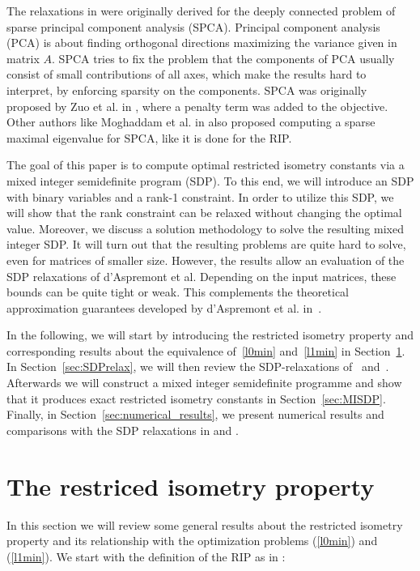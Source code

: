 \documentclass[journal]{IEEEtran}
\begin{document}
The relaxations in \cite{Asp07,Asp08} were originally derived for the deeply
connected problem of sparse principal component analysis (SPCA). Principal
component analysis (PCA) is about finding orthogonal directions maximizing the 
variance given in matrix $A$. SPCA tries to fix the problem that the components
of PCA usually consist of small contributions of all axes, which make the results
hard to interpret, by enforcing sparsity on the components. SPCA was
originally proposed by Zuo et al. in \cite{SPCA}, where a penalty term was added 
to the objective. Other authors like Moghaddam et al. in \cite{sbSPCA} also proposed 
computing a sparse maximal eigenvalue for SPCA, like it is done for the RIP.

The goal of this paper is to compute optimal restricted isometry constants
via a mixed integer semidefinite program (SDP). To this end, we will
introduce an SDP with binary variables and a rank-1 constraint. In order to
utilize this SDP, we will show that the rank constraint can be relaxed
without changing the optimal value. Moreover, we discuss a solution
methodology to solve the resulting mixed integer SDP. It will turn out that
the resulting problems are quite hard to solve, even for matrices of
smaller size. However, the results allow an evaluation of the SDP
relaxations of d'Aspremont et al. Depending on the input matrices, these
bounds can be quite tight or weak. This complements the theoretical
approximation guarantees developed by d'Aspremont et
al. in~\cite{AspBG14}.

In the following, we will start by introducing the restricted isometry
property and corresponding results about the equivalence of~\eqref{l0min}
and~\eqref{l1min} in Section~\ref{sec:RIP}. In Section~\ref{sec:SDPrelax},
we will then review the SDP-relaxations of~\cite{Asp07}
and~\cite{Asp08}. Afterwards we will construct a mixed integer semidefinite
programme and show that it produces exact restricted isometry constants in
Section~\ref{sec:MISDP}. Finally, in Section~\ref{sec:numerical_results},
we present numerical results and comparisons with the SDP relaxations in
\cite{Asp07} and \cite{Asp08}.

\section{The restriced isometry property}
\label{sec:RIP}

In this section we will review some general results about the restricted
isometry property and its relationship with the optimization problems
(\ref{l0min}) and (\ref{l1min}). We start with the definition of the RIP as
in \cite{CT05}:
\end{document}
